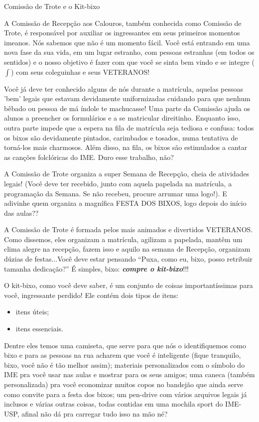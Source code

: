 \begin{secao}{Comissão de Trote e o Kit-bixo}

A Comissão de Recepção aos Calouros, também conhecida como Comissão de Trote,
é responsável por auxiliar os ingressantes em seus primeiros momentos imeanos.
Nós sabemos que não é um momento fácil. Você está entrando em uma nova fase da
sua vida, em um lugar estranho, com pessoas estranhas (em todos os sentidos) e
o nosso objetivo é fazer com que você se sinta bem vindo e se integre ($\int$)
com seus coleguinhas e seus VETERANOS!

Você já deve ter conhecido alguns de nós durante a matrícula, aquelas pessoas
'bem' legais que estavam devidamente uniformizadas cuidando para que nenhum
bêbado ou pessoa de má índole te machucasse! Uma parte da Comissão ajuda os
alunos a preencher os formulários e a se matricular direitinho. Enquanto isso,
outra parte impede que a espera na fila de matrícula seja tediosa e confusa:
todos os bixos são devidamente pintados, carimbados e tosados, numa tentativa
de torná-los mais charmosos. Além disso, na fila, os bixos são estimulados a
cantar as canções folclóricas do IME. Duro esse trabalho, não?

A Comissão de Trote organiza a super Semana de Recepção, cheia de atividades
legais! (Você deve ter recebido, junto com aquela papelada na matrícula, a
programação da Semana. Se não recebeu, procure arrumar uma logo!).
E adivinhe quem organiza a magnífica FESTA DOS BIXOS, logo depois do início
das aulas??

A Comissão de Trote é formada pelos mais animados e divertidos VETERANOS. Como
dissemos, eles organizam a matrícula, agilizam a papelada, mantêm um clima
alegre na recepção, fazem isso e aquilo na semana de Recepção, organizam dúzias
de festas...Você deve estar pensando ``Puxa, como eu, bixo, posso retribuir
tamanha dedicação?'' É simples, bixo: {\bf\em compre o kit-bixo}!!!

O kit-bixo, como você deve saber, é um conjunto de coisas importantíssimas
para você, ingressante perdido! Ele contém dois tipos de itens:
\begin{itemize}
\item itens úteis;
\item itens essenciais. 
\end{itemize}
Dentre eles temos uma camiseta, que serve para que
nós o identifiquemos como bixo e para as pessoas na rua acharem que você é
inteligente (fique tranquilo, bixo, você não é tão melhor assim); materiais 
personalizados com o símbolo do IME pra você usar nas aulas e mostrar para os seus amigos;
uma caneca (também personalizada) pra você economizar muitos copos no bandejão
que ainda serve como convite para a festa dos bixos;
um pen-drive com vários arquivos legais já inclusos e várias outras coisas,
todas contidas em uma mochila sport do IME-USP, afinal não dá pra carregar tudo
isso na mão né?


\end{secao}
